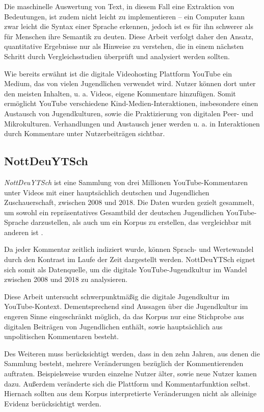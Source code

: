 Die maschinelle Auswertung von Text, in diesem Fall eine Extraktion von Bedeutungen, ist zudem nicht leicht zu implementieren -- ein Computer kann zwar leicht die Syntax einer Sprache erkennen, jedoch ist es für ihn schwerer als für Menschen ihre Semantik zu deuten.
Diese Arbeit verfolgt daher den Ansatz, quantitative Ergebnisse nur als Hinweise zu verstehen, die in einem nächsten Schritt durch Vergleichsstudien überprüft und analysiert werden sollten.

Wie bereits erwähnt ist die digitale Videohosting Plattform YouTube ein Medium, das von vielen Jugendlichen verwendet wird.
Nutzer können dort unter den meisten Inhalten, u. a. Videos, eigene Kommentare hinzufügen.
Somit ermöglicht YouTube verschiedene Kind-Medien-Interaktionen, insbesondere einen Austausch von Jugendkulturen, sowie die Praktizierung von digitalen Peer- und Mikrokulturen.
Verhandlungen und Austausch jener werden u. a. in Interaktionen durch Kommentare unter Nutzerbeiträgen sichtbar.

\subsection{NottDeuYTSch} \label{subsec:2.1}
\emph{NottDeuYTSch} \autocite{Cot18, Cot23} ist eine Sammlung von drei Millionen YouTube-Kommentaren unter Videos mit einer hauptsächlich deutschen und Jugendlichen Zuschauerschaft, zwischen 2008 und 2018.
Die Daten wurden gezielt gesammelt, um sowohl ein repräsentatives Gesamtbild der deutschen Jugendlichen YouTube-Sprache darzustellen, als auch um ein Korpus zu erstellen, das vergleichbar mit anderen ist \autocite{Cot23}.

Da jeder Kommentar zeitlich indiziert wurde, können Sprach- und Wertewandel durch den Kontrast im Laufe der Zeit dargestellt werden.
NottDeuYTSch eignet sich somit als Datenquelle, um die digitale YouTube-Jugendkultur im Wandel zwischen 2008 und 2018 zu analysieren.

Diese Arbeit untersucht schwerpunktmäßig die digitale Jugendkultur im YouTube-Kontext.
Dementsprechend sind Aussagen über die Jugendkultur im engeren Sinne eingeschränkt möglich, da das Korpus nur eine Stichprobe aus digitalen Beiträgen von Jugendlichen enthält, sowie hauptsächlich aus unpolitischen Kommentaren besteht.

Des Weiteren muss berücksichtigt werden, dass in den zehn Jahren, aus denen die Sammlung besteht, mehrere Veränderungen bezüglich der Kommentierenden auftraten.
Beispielsweise wurden einzelne Nutzer älter, sowie neue Nutzer kamen dazu.
Außerdem veränderte sich die Plattform und Kommentarfunktion selbst.
Hiernach sollten aus dem Korpus interpretierte Veränderungen nicht als alleinige Evidenz berücksichtigt werden.

